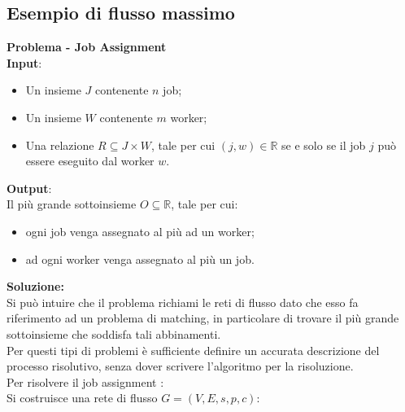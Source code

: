 \documentclass[../cheatSheetAlgoritmi.tex]{subfiles}
\begin{document}
\subsection{Esempio di flusso massimo}
\textbf{Problema - Job Assignment} \\
\textbf{Input}: 
\begin{itemize}
	\item Un insieme $J$ contenente $n$ job;
	\item Un insieme $W$ contenente $m$ worker;
	\item Una relazione $R \subseteq J \times W$, tale per cui $(j, w) \in \mathbb{R}$ se e solo se il job $j$ può essere eseguito dal worker $w$.
\end{itemize}
\textbf{Output}:\\
 Il più grande sottoinsieme $O \subseteq \mathbb{R}$, tale per cui:
\begin{itemize}
	\item ogni job venga assegnato al più ad un worker;
	\item ad ogni worker venga assegnato al più un job.
\end{itemize}
\textbf{Soluzione:} \\
Si può intuire che il problema richiami le reti di flusso dato che esso fa riferimento ad un problema di matching, in particolare di trovare il più grande sottoinsieme che soddisfa tali abbinamenti. \\
Per questi tipi di problemi è sufficiente definire un accurata descrizione del processo risolutivo, senza dover scrivere l'algoritmo per la risoluzione. \\
Per risolvere il job assignment :\\ 
Si costruisce una rete di flusso $G = (V, E, s, p, c)$:
\end{document}
